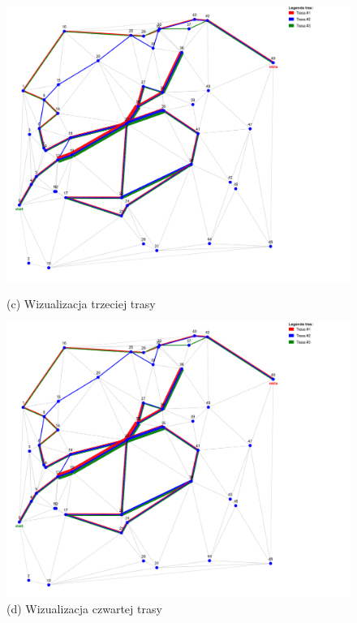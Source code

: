 \documentclass{article}
\begin{document}
\begin{figure}[H]
    \vspace{0.5em}
    \begin{minipage}[b]{0.48\linewidth}
        \includegraphics[width=\linewidth]{423C496B-894F-48DF-AD3A-845B3B00989B.png}
        \caption*{(c) Wizualizacja trzeciej trasy}
    \end{minipage}
    \hfill
    \begin{minipage}[b]{0.48\linewidth}
        \includegraphics[width=\linewidth]{423C496B-894F-48DF-AD3A-845B3B00989B.png}
        \caption*{(d) Wizualizacja czwartej trasy}
    \end{minipage}


\end{figure}
\end{document}
